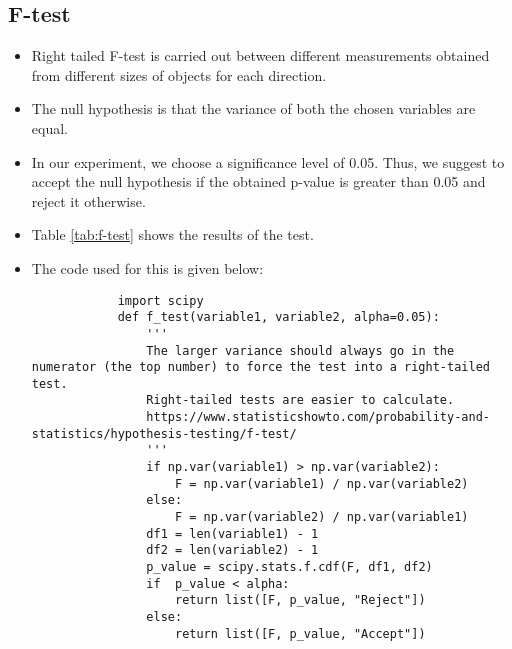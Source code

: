     \subsection{F-test}
    \begin{itemize}
        \item Right tailed F-test is carried out between different measurements obtained from different sizes of objects for each direction. 
        \item The null hypothesis is that the variance of both the chosen variables are equal. 
        \item In our experiment, we choose a significance level of 0.05. Thus, we suggest to accept the null hypothesis if the obtained p-value is greater than 0.05 and reject it otherwise.
        \item Table \ref{tab:f-test} shows the results of the test.
        \item The code used for this is given below:
        
        \begin{verbatim}
            import scipy
            def f_test(variable1, variable2, alpha=0.05):
                '''
                The larger variance should always go in the numerator (the top number) to force the test into a right-tailed test.
                Right-tailed tests are easier to calculate.
                https://www.statisticshowto.com/probability-and-statistics/hypothesis-testing/f-test/
                '''
                if np.var(variable1) > np.var(variable2):
                    F = np.var(variable1) / np.var(variable2)
                else:
                    F = np.var(variable2) / np.var(variable1)
                df1 = len(variable1) - 1
                df2 = len(variable2) - 1
                p_value = scipy.stats.f.cdf(F, df1, df2)
                if  p_value < alpha:
                    return list([F, p_value, "Reject"])
                else:
                    return list([F, p_value, "Accept"])
        \end{verbatim}
        
    \end{itemize}
